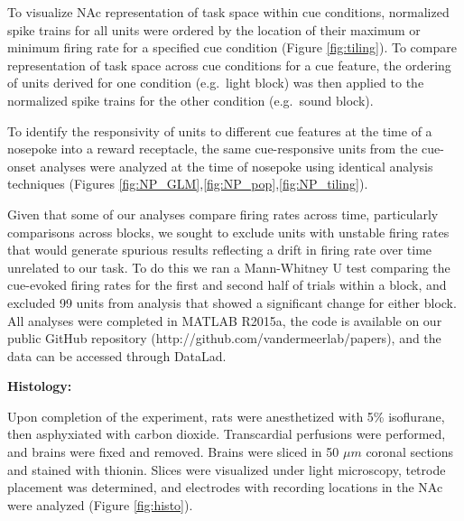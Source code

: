 \documentclass[11pt]{article}
\begin{document}
To visualize NAc representation of task space within cue conditions, normalized spike trains for all units were ordered by the location of their maximum or minimum firing rate for a specified cue condition (Figure \ref{fig:tiling}). To compare representation of task space across cue conditions for a cue feature, the ordering of units derived for one condition (e.g.\ light block) was then applied to the normalized spike trains for the other condition (e.g.\ sound block).

To identify the responsivity of units to different cue features at the time of a nosepoke into a reward receptacle, the same cue-responsive units from the cue-onset analyses were analyzed at the time of nosepoke using identical analysis techniques (Figures \ref{fig:NP_GLM},\ref{fig:NP_pop},\ref{fig:NP_tiling}).

Given that some of our analyses compare firing rates across time, particularly comparisons across blocks, we sought to exclude units with unstable firing rates that would generate spurious results reflecting a drift in firing rate over time unrelated to our task. To do this we ran a Mann-Whitney U test comparing the cue-evoked firing rates for the first and second half of trials within a block, and excluded 99 units from analysis that showed a significant change for either block. All analyses were completed in MATLAB R2015a, the code is available on our public GitHub repository (http://github.com/vandermeerlab/papers), and the data can be accessed through DataLad.

{\bf Histology:}

Upon completion of the experiment, rats were anesthetized with 5\% isoflurane, then asphyxiated with carbon dioxide. Transcardial perfusions were performed, and brains were fixed and removed. Brains were sliced in 50 $\mu m$ coronal sections and stained with thionin. Slices were visualized under light microscopy, tetrode placement was determined, and electrodes with recording locations in the NAc were analyzed (Figure \ref{fig:histo}).
\end{document}
